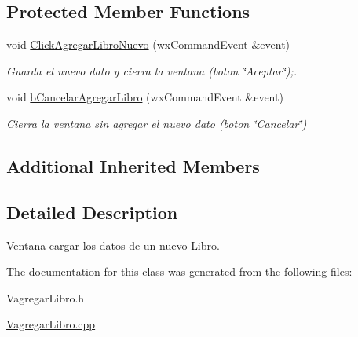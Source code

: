 \subsection*{Protected Member Functions}
\begin{DoxyCompactItemize}
\item 
void \hyperlink{class_vagregar_libro_a848f2a9686325c645e79a3c27baab56d}{Click\+Agregar\+Libro\+Nuevo} (wx\+Command\+Event \&event)\hypertarget{class_vagregar_libro_a848f2a9686325c645e79a3c27baab56d}{}\label{class_vagregar_libro_a848f2a9686325c645e79a3c27baab56d}

\begin{DoxyCompactList}\small\item\em Guarda el nuevo dato y cierra la ventana (boton \char`\"{}\+Aceptar\char`\"{});. \end{DoxyCompactList}\item 
void \hyperlink{class_vagregar_libro_ac06f67ffcf2968aa6c1412e047b16109}{b\+Cancelar\+Agregar\+Libro} (wx\+Command\+Event \&event)\hypertarget{class_vagregar_libro_ac06f67ffcf2968aa6c1412e047b16109}{}\label{class_vagregar_libro_ac06f67ffcf2968aa6c1412e047b16109}

\begin{DoxyCompactList}\small\item\em Cierra la ventana sin agregar el nuevo dato (boton \char`\"{}\+Cancelar\char`\"{}) \end{DoxyCompactList}\end{DoxyCompactItemize}
\subsection*{Additional Inherited Members}


\subsection{Detailed Description}
Ventana cargar los datos de un nuevo \hyperlink{class_libro}{Libro}. 

The documentation for this class was generated from the following files\+:\begin{DoxyCompactItemize}
\item 
Vagregar\+Libro.\+h\item 
\hyperlink{_vagregar_libro_8cpp}{Vagregar\+Libro.\+cpp}\end{DoxyCompactItemize}
